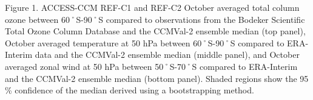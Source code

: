 Figure 1. ACCESS-CCM REF-C1 and REF-C2 October averaged total column ozone between 60˚S-90˚S compared to observations from the Bodeker Scientific Total Ozone Column Database and the CCMVal-2 ensemble median (top panel), October averaged temperature at 50 hPa between 60˚S-90˚S compared to ERA-Interim data and the CCMVal-2 ensemble median (middle panel), and October averaged zonal wind at 50 hPa between 50˚S-70˚S compared to ERA-Interim and the CCMVal-2 ensemble median (bottom panel). Shaded regions show the 95\,\% confidence of the median derived using a bootstrapping method.
